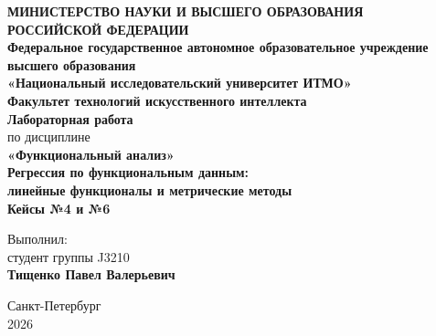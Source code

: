 \documentclass[14pt,a4paper]{extarticle}
\begin{document}

\begin{titlepage}
    \begin{center}
        \textbf{МИНИСТЕРСТВО НАУКИ И ВЫСШЕГО ОБРАЗОВАНИЯ\\
        РОССИЙСКОЙ ФЕДЕРАЦИИ}\\[0.5cm]

        \textbf{Федеральное государственное автономное образовательное учреждение\\
        высшего образования}\\[0.3cm]

        \textbf{«Национальный исследовательский университет ИТМО»}\\[1.5cm]

        \textbf{Факультет технологий искусственного интеллекта}\\[2cm]

        \textbf{\Large Лабораторная работа}\\[0.5cm]

        по дисциплине\\
        \textbf{«Функциональный анализ»}\\[1cm]

        \textbf{\Large Регрессия по функциональным данным:}\\[0.2cm]
        \textbf{\Large линейные функционалы и метрические методы}\\[0.8cm]

        \textbf{Кейсы №4 и №6}\\[2cm]
    \end{center}

    \begin{flushright}
        Выполнил:\\
        студент группы J3210\\
        \textbf{Тищенко Павел Валерьевич}
    \end{flushright}

    \vfill

    \begin{center}
        Санкт-Петербург\\
        2026
    \end{center}
\end{titlepage}

\end{document}
